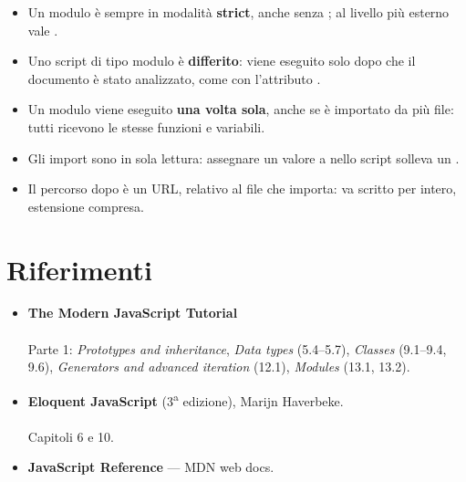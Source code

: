 \begin{itemize}
  \item Un modulo è sempre in modalità \textbf{strict}, anche senza
        ; al livello più esterno  vale
        .
  \item Uno script di tipo modulo è \textbf{differito}: viene eseguito solo
        dopo che il documento è stato analizzato, come con l'attributo
        .
  \item Un modulo viene eseguito \textbf{una volta sola}, anche se è importato
        da più file: tutti ricevono le stesse funzioni e variabili.
  \item Gli import sono in sola lettura: assegnare un valore a 
        nello script solleva un .
  \item Il percorso dopo  è un URL, relativo al file che importa:
        va scritto per intero, estensione  compresa.
\end{itemize}


\section{Riferimenti}

\begin{itemize}
  \item \textbf{The Modern JavaScript Tutorial} \\
         \\
        Parte 1: \textit{Prototypes and inheritance}, \textit{Data types}
        (5.4--5.7), \textit{Classes} (9.1--9.4, 9.6), \textit{Generators and
        advanced iteration} (12.1), \textit{Modules} (13.1, 13.2).
  \item \textbf{Eloquent JavaScript} (3\textsuperscript{a} edizione), Marijn
        Haverbeke. \\
         \\
        Capitoli 6 e 10.
  \item \textbf{JavaScript Reference} --- MDN web docs. \\
\end{itemize}
